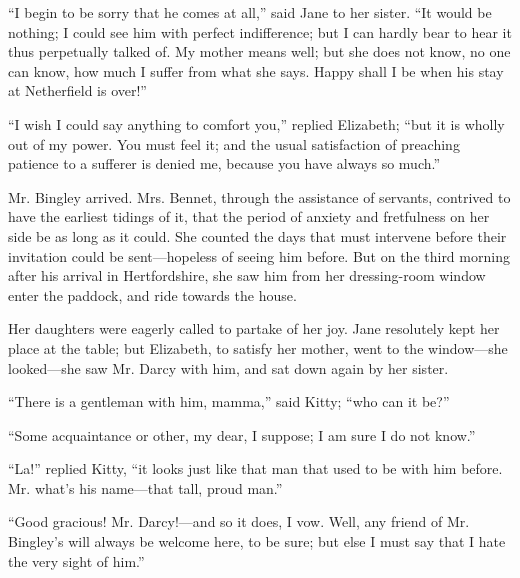 \documentclass[10pt]{book}
\begin{document}
   “I begin to be sorry that he comes at all,” said Jane to her sister. “It
would be nothing; I could see him with perfect indifference; but I can
hardly bear to hear it thus perpetually talked of. My mother means well;
but she does not know, no one can know, how much I suffer from what she
says. Happy shall I be when his stay at Netherfield is over!”
  

   “I wish I could say anything to comfort you,” replied Elizabeth; “but it
is wholly out of my power. You must feel it; and the usual satisfaction
of preaching patience to a sufferer is denied me, because you have
always so much.”
  

   Mr. Bingley arrived. Mrs. Bennet, through the assistance of servants,
contrived to have the earliest tidings of it, that the period of anxiety
and fretfulness on her side be as long as it could. She counted the days
that
   must intervene before their invitation could be sent—hopeless of
seeing him before. But on the third morning after his arrival in
Hertfordshire, she saw him from her dressing-room window enter the
paddock, and ride towards the house.
  

   Her daughters were eagerly called to partake of her joy. Jane resolutely
kept her place at the table; but Elizabeth, to satisfy her mother, went
to the window—she looked—she saw Mr. Darcy with him, and sat down
again by her sister.
  

   “There is a gentleman with him, mamma,” said Kitty; “who can it be?”
  

   “Some acquaintance or other, my dear, I suppose; I am sure I do not
know.”
  

   “La!” replied Kitty, “it looks just like that man that used to be with
him before. Mr. what’s his name—that tall, proud man.”
  

   “Good gracious! Mr. Darcy!—and so it does, I vow. Well, any friend of
Mr. Bingley’s will always be welcome here, to be sure; but else I must
say that I hate the very sight of him.”
  
\end{document}
